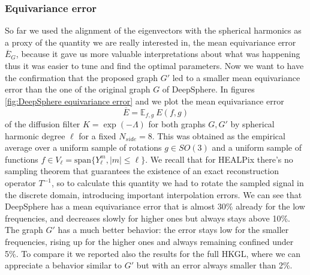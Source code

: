 \subsubsection{Equivariance error}
So far we used the alignment of the eigenvectors with the spherical harmonics as a proxy of the quantity we are really interested in, the mean equivariance error $\overline E_G$, because it gave us more valuable interpretations about what was happening thus it was easier to tune and find the optimal parameters. Now we want to have the confirmation that the proposed graph $G'$ led to a smaller mean equivariance error than the one of the original graph $G$ of DeepSphere.
In figures \ref{fig:DeepSphere equivariance error} and we plot the mean equivariance error 
$$\overline E = \mathbb E_{f, g}\ E(f, g)
$$ of the diffusion filter $K = \exp(-\Lambda)$ for both graphs $G, G'$ by spherical harmonic degree $\ell$ for a fixed $N_{side}=8$. This was obtained as the empirical average over a uniform sample of rotations $g\in SO(3)$ and a uniform sample of functions $f\in V_\ell = \text{span}\{Y_\ell^m, |m|\leq \ell\}$. We recall that for HEALPix there's no sampling theorem that guarantees the existence of an exact reconstruction operator $T^{-1}$, so to calculate this quantity we had to rotate the sampled signal in the discrete domain, introducing important interpolation errors. We can see that DeepSphere has a mean equivariance error that is almost 30\% already for the low frequencies, and decreases slowly for higher ones but always stays above 10\%. The graph $G'$ has a much better behavior: the error stays low for the smaller frequencies, rising up for the higher ones and always remaining confined under 5\%. To compare it we reported also the results for the full HKGL, where we can appreciate a behavior similar to $G'$ but with an error always smaller than 2\%.

